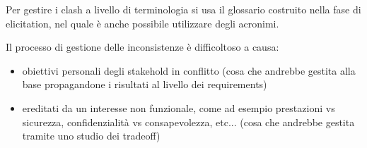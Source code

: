 Per gestire i clash a livello di terminologia si usa il glossario costruito nella
fase di elicitation, nel quale è anche possibile utilizzare degli acronimi.

Il processo di gestione delle inconsistenze è difficoltoso a causa:
\begin{itemize}
      \item obiettivi personali degli stakehold in conflitto (cosa che
            andrebbe gestita alla base propagandone i risultati al livello dei requirements)
      \item ereditati da un interesse non funzionale, come ad esempio prestazioni vs
            sicurezza, confidenzialità vs consapevolezza, etc... (cosa che andrebbe
            gestita tramite uno studio dei tradeoff)
\end{itemize}

